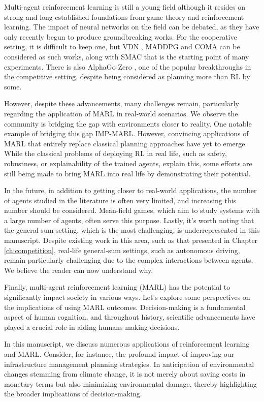 Multi-agent reinforcement learning is still a young field although it resides on strong and long-established foundations from game theory and reinforcement learning.
The impact of neural networks on the field can be debated, as they have only recently begun to produce groundbreaking works.
For the cooperative setting, it is difficult to keep one, but VDN \citep{sunehag2018vdn}, MADDPG \cite{lowe2017multi} and COMA \citep{foerster2017coma} can be considered as such works, along with SMAC \citep{samvelyan2019starcraft} that is the starting point of many experiments.
There is also AlphaGo Zero \citep{silver2017mastering}, one of the popular breakthroughs in the competitive setting, despite being considered as planning more than RL by some.

However, despite these advancements, many challenges remain, particularly regarding the application of MARL in real-world scenarios.
We observe the community is bridging the gap with environments closer to reality.
One notable example of bridging this gap IMP-MARL.
However, convincing applications of MARL that entirely replace classical planning approaches have yet to emerge.
While the classical problems of deploying RL in real life, such as safety, robustness, or explainability of the trained agents, explain this, some efforts are still being made to bring MARL into real life by demonstrating their potential.

In the future, in addition to getting closer to real-world applications, the number of agents studied in the literature is often very limited, and increasing this number should be considered.
Mean-field games, which aim to study systems with a large number of agents, often serve this purpose.
Lastly, it's worth noting that the general-sum setting, which is the most challenging, is underrepresented in this manuscript.
Despite existing work in this area, such as that presented in Chapter \ref{ch:competition}, real-life general-sum settings, such as autonomous driving, remain particularly challenging due to the complex interactions between agents.
We believe the reader can now understand why.

Finally, multi-agent reinforcement learning (MARL) has the potential to significantly impact society in various ways.
Let's explore some perspectives on the implications of using MARL outcomes.
Decision-making is a fundamental aspect of human cognition, and throughout history, scientific advancements have played a crucial role in aiding humans making decisions.

In this manuscript, we discuss numerous applications of reinforcement learning and MARL. 
Consider, for instance, the profound impact of improving our infrastructure management planning strategies.
In anticipation of environmental changes stemming from climate change, it is not merely about saving costs in monetary terms but also minimizing environmental damage, thereby highlighting the broader implications of decision-making.

